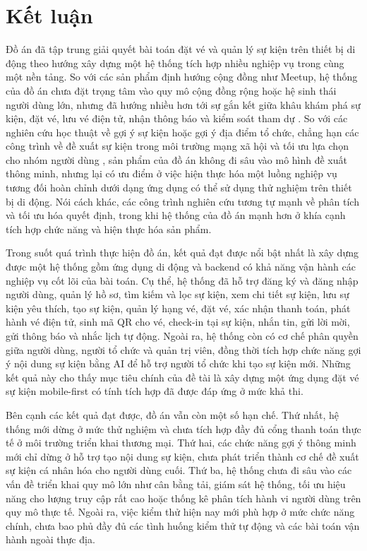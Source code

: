 \documentclass[../DoAn.tex]{subfiles}
\begin{document}
\section{Kết luận}
Đồ án đã tập trung giải quyết bài toán đặt vé và quản lý sự kiện trên thiết bị di động theo hướng xây dựng một hệ thống tích hợp nhiều nghiệp vụ trong cùng một nền tảng. So với các sản phẩm định hướng cộng đồng như Meetup, hệ thống của đồ án chưa đặt trọng tâm vào quy mô cộng đồng rộng hoặc hệ sinh thái người dùng lớn, nhưng đã hướng nhiều hơn tới sự gắn kết giữa khâu khám phá sự kiện, đặt vé, lưu vé điện tử, nhận thông báo và kiểm soát tham dự \cite{meetup2026about}. So với các nghiên cứu học thuật về gợi ý sự kiện hoặc gợi ý địa điểm tổ chức, chẳng hạn các công trình về đề xuất sự kiện trong môi trường mạng xã hội và tối ưu lựa chọn cho nhóm người dùng \cite{cena2014event,liao2020acger,zhang2019gevr}, sản phẩm của đồ án không đi sâu vào mô hình đề xuất thông minh, nhưng lại có ưu điểm ở việc hiện thực hóa một luồng nghiệp vụ tương đối hoàn chỉnh dưới dạng ứng dụng có thể sử dụng thử nghiệm trên thiết bị di động. Nói cách khác, các công trình nghiên cứu tương tự mạnh về phân tích và tối ưu hóa quyết định, trong khi hệ thống của đồ án mạnh hơn ở khía cạnh tích hợp chức năng và hiện thực hóa sản phẩm.

Trong suốt quá trình thực hiện đồ án, kết quả đạt được nổi bật nhất là xây dựng được một hệ thống gồm ứng dụng di động và backend có khả năng vận hành các nghiệp vụ cốt lõi của bài toán. Cụ thể, hệ thống đã hỗ trợ đăng ký và đăng nhập người dùng, quản lý hồ sơ, tìm kiếm và lọc sự kiện, xem chi tiết sự kiện, lưu sự kiện yêu thích, tạo sự kiện, quản lý hạng vé, đặt vé, xác nhận thanh toán, phát hành vé điện tử, sinh mã \gls{QR} cho vé, check-in tại sự kiện, nhắn tin, gửi lời mời, gửi thông báo và nhắc lịch tự động. Ngoài ra, hệ thống còn có cơ chế phân quyền giữa người dùng, người tổ chức và quản trị viên, đồng thời tích hợp chức năng gợi ý nội dung sự kiện bằng AI để hỗ trợ người tổ chức khi tạo sự kiện mới. Những kết quả này cho thấy mục tiêu chính của đề tài là xây dựng một ứng dụng đặt vé sự kiện mobile-first có tính tích hợp đã được đáp ứng ở mức khả thi.

Bên cạnh các kết quả đạt được, đồ án vẫn còn một số hạn chế. Thứ nhất, hệ thống mới dừng ở mức thử nghiệm và chưa tích hợp đầy đủ cổng thanh toán thực tế ở môi trường triển khai thương mại. Thứ hai, các chức năng gợi ý thông minh mới chỉ dừng ở hỗ trợ tạo nội dung sự kiện, chưa phát triển thành cơ chế đề xuất sự kiện cá nhân hóa cho người dùng cuối. Thứ ba, hệ thống chưa đi sâu vào các vấn đề triển khai quy mô lớn như cân bằng tải, giám sát hệ thống, tối ưu hiệu năng cho lượng truy cập rất cao hoặc thống kê phân tích hành vi người dùng trên quy mô thực tế. Ngoài ra, việc kiểm thử hiện nay mới phù hợp ở mức chức năng chính, chưa bao phủ đầy đủ các tình huống kiểm thử tự động và các bài toán vận hành ngoài thực địa.
\end{document}
